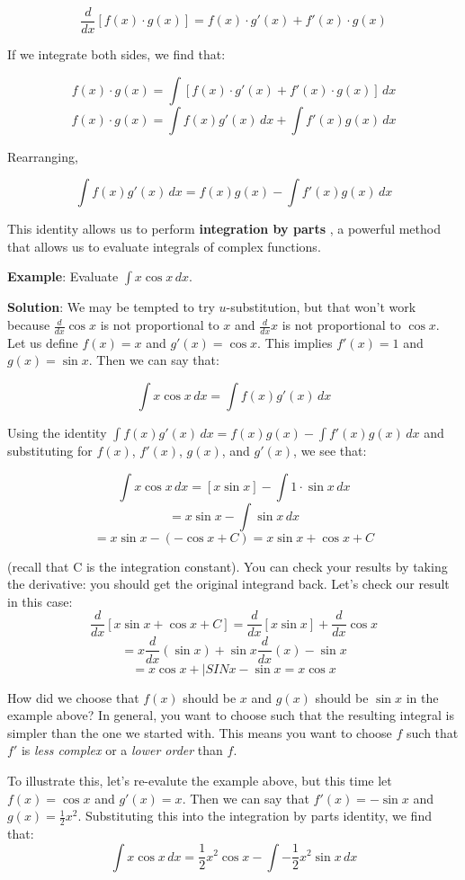$$\frac{d}{dx} \left[ f(x) \cdot g(x) \right] = f(x) \cdot g'(x) + f'(x) \cdot g(x)$$

If we integrate both sides, we find that:

$$f(x) \cdot g(x) = \int \left[ f(x) \cdot g'(x) + f'(x) \cdot g(x) \right]\,dx$$
$$f(x) \cdot g(x) = \int f(x)g'(x)\,dx + \int f'(x)g(x)\,dx$$

Rearranging, 

$$\int f(x)g'(x)\,dx = f(x)g(x) - \int f'(x)g(x)\,dx$$

This identity allows us to perform \textbf{integration by parts}
, a powerful method that allows us to evaluate 
integrals of complex functions. 

\textbf{Example}: Evaluate $\int x \cos{x} \,dx$.

\textbf{Solution}: We may be tempted to try $u$-substitution, but that won't 
work because $\frac{d}{dx} \cos{x}$ is not proportional to $x$ and $\frac{d}{dx} 
x$ is not proportional to $\cos{x}$. Let us define $f(x) = x$ and $g'(x) = 
\cos{x}$. This implies $f'(x) = 1$ and $g(x) = \sin{x}$. Then we can say that:

$$\int x \cos{x} \,dx = \int f(x)g'(x)\,dx$$

Using the identity $\int f(x)g'(x)\,dx = f(x)g(x) - \int f'(x)g(x)\,dx$ and 
substituting for $f(x)$, $f'(x)$, $g(x)$, and $g'(x)$, we see that:

$$\int x \cos{x} \,dx = \left[ x \sin{x} \right] - \int 1 \cdot \sin{x}\,dx$$
$$= x \sin{x} - \int \sin{x}\,dx$$
$$= x \sin{x} - \left( -\cos{x}  + C \right) = x \sin{x} + \cos{x} + C$$

(recall that C is the integration constant). You can check your results by 
taking the derivative: you should get the original integrand back. Let's check 
our result in this case:
$$\frac{d}{dx} \left[ x \sin{x} + \cos{x} + C \right] = \frac{d}{dx} \left[x 
\sin{x} \right] + \frac{d}{dx} \cos{x}$$
$$= x \frac{d}{dx} \left( \sin{x} \right) + \sin{x} \frac{d}{dx} (x) - \sin{x}$$
$$= x \cos{x} +|SIN{x} - \sin{x} = x \cos{x}$$

How did we choose that $f(x)$ should be $x$ and $g(x)$ should be $\sin{x}$ in 
the example above? In general, you want to choose such that the resulting 
integral is simpler than the one we started with. This means you want to choose 
$f$ such that $f'$ is \textit{less complex} or a \textit{lower order} than $f$. 

To illustrate this, let's re-evalute the example above, but this time let $f(x) 
= \cos{x}$ and $g'(x) = x$. Then we can say that $f'(x) = -\sin{x}$ and $g(x) 
= \frac{1}{2}x^2$. Substituting this into the integration by parts identity, 
we find that:
$$\int x \cos{x} \,dx = \frac{1}{2}x^2 \cos{x} - \int -\frac{1}{2}x^2 \sin{x}\,dx$$

